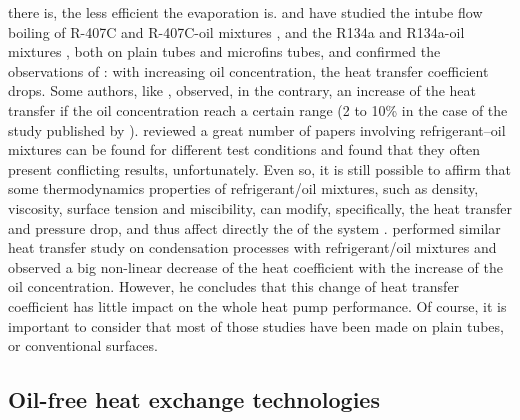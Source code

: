 there is, the less efficient the evaporation is.
\citet{Nidegger-Thome-1997a} and \citet{Zurcher-Favrat-1998a} have
studied the intube flow boiling of R-407C and R-407C-oil mixtures
\citep{Zurcher-Favrat-1998a,Zurcher-Favrat-1998b}, and the R134a and
R134a-oil mixtures \citep{Zurcher-Favrat-1997a,Nidegger-Thome-1997a},
both on plain tubes and microfins tubes, and confirmed the
observations of \citet{McMullan-Morgan-1983a}: with increasing oil
concentration, the heat transfer coefficient drops. Some authors, like
\citet{Cawte-Poland-1996a}, observed, in the contrary, an increase of
the heat transfer if the oil concentration reach a certain range (2 to
10\% in the case of the study published by
\citet{Cawte-Poland-1996a}). \citet{BandarraFilho-Thome-2009a}
reviewed a great number of papers involving refrigerant–oil mixtures
can be found for different test conditions and found that they often
present conflicting results, unfortunately. Even so, it is still
possible to affirm that some thermodynamics properties of
refrigerant/oil mixtures, such as density, viscosity, surface tension
and miscibility, can modify, specifically, the heat transfer and
pressure drop, and thus affect directly the \COP{} of the system
\citet[p.\,186]{BandarraFilho-Thome-2009a}. \citet{Cawte-1992a}
performed similar heat transfer study on condensation processes with
refrigerant/oil mixtures and observed a big non-linear decrease of the
heat coefficient with the increase of the oil concentration. However,
he concludes that this change of heat transfer coefficient has little
impact on the whole heat pump performance. Of course, it is important
to consider that most of those studies have been made on plain tubes,
or conventional surfaces.

\subsection{Oil-free heat exchange technologies}
\label{sec:sota-oilfree-hx}

